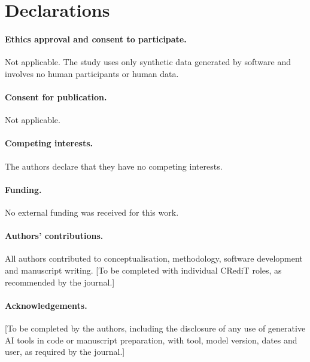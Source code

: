\documentclass[11pt,a4paper]{article}
\begin{document}
\section*{Declarations}
\paragraph{Ethics approval and consent to participate.} Not applicable. The study uses only synthetic data generated by software and involves no human participants or human data.
\paragraph{Consent for publication.} Not applicable.
\paragraph{Competing interests.} The authors declare that they have no competing interests.
\paragraph{Funding.} No external funding was received for this work.
\paragraph{Authors' contributions.} All authors contributed to conceptualisation, methodology, software development and manuscript writing. [To be completed with individual CRediT roles, as recommended by the journal.]
\paragraph{Acknowledgements.} [To be completed by the authors, including the disclosure of any use of generative AI tools in code or manuscript preparation, with tool, model version, dates and user, as required by the journal.]



\end{document}
